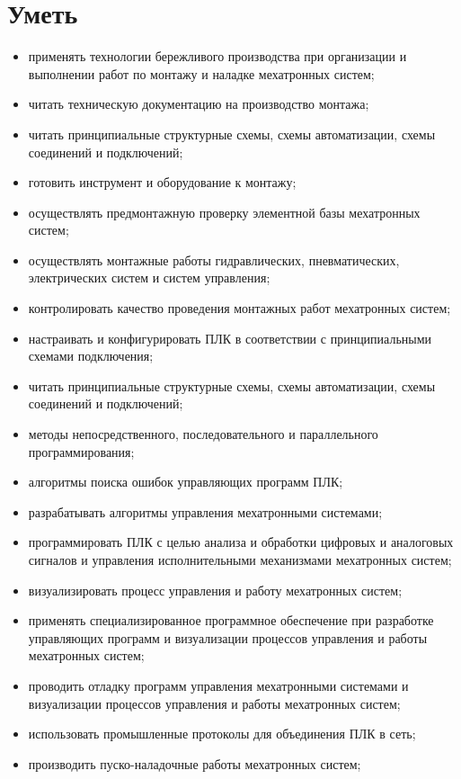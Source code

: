 \section*{Уметь}
\begin{itemize}
    \item применять технологии бережливого производства при организации и выполнении работ по монтажу и наладке мехатронных систем;
    \item читать техническую документацию на производство монтажа;
    \item читать принципиальные структурные схемы, схемы автоматизации, схемы соединений и подключений;
    \item готовить инструмент и оборудование к монтажу;
    \item осуществлять предмонтажную проверку элементной базы мехатронных систем;
    \item осуществлять монтажные работы гидравлических, пневматических, электрических систем и систем управления;
    \item контролировать качество проведения монтажных работ мехатронных систем;
    \item настраивать и конфигурировать ПЛК в соответствии с принципиальными схемами подключения;
    \item читать принципиальные структурные схемы, схемы автоматизации, схемы соединений и подключений;
    \item методы непосредственного, последовательного и параллельного программирования;
    \item алгоритмы поиска ошибок управляющих программ ПЛК;
    \item разрабатывать алгоритмы управления мехатронными системами;
    \item программировать ПЛК с целью анализа и обработки цифровых и аналоговых сигналов и управления исполнительными механизмами мехатронных систем;
    \item визуализировать процесс управления и работу мехатронных систем;
    \item применять специализированное программное обеспечение при разработке управляющих программ и визуализации процессов управления и работы мехатронных систем;
    \item проводить отладку программ управления мехатронными системами и визуализации процессов управления и работы мехатронных систем;
    \item использовать промышленные протоколы для объединения ПЛК в сеть;
    \item производить пуско-наладочные работы мехатронных систем;

\end{itemize}
